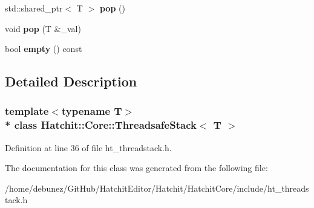 \begin{DoxyCompactItemize}
\item 
std\+::shared\+\_\+ptr$<$ T $>$ {\bfseries pop} ()\hypertarget{classHatchit_1_1Core_1_1ThreadsafeStack_aafae0641050816de8ca7c5090ab0a627}{}\label{classHatchit_1_1Core_1_1ThreadsafeStack_aafae0641050816de8ca7c5090ab0a627}

\item 
void {\bfseries pop} (T \&\+\_\+val)\hypertarget{classHatchit_1_1Core_1_1ThreadsafeStack_a4f6199d86eb2f311c9c58b3e23ad840e}{}\label{classHatchit_1_1Core_1_1ThreadsafeStack_a4f6199d86eb2f311c9c58b3e23ad840e}

\item 
bool {\bfseries empty} () const \hypertarget{classHatchit_1_1Core_1_1ThreadsafeStack_a9ac7b4af62073685e7150081003fd01c}{}\label{classHatchit_1_1Core_1_1ThreadsafeStack_a9ac7b4af62073685e7150081003fd01c}

\end{DoxyCompactItemize}


\subsection{Detailed Description}
\subsubsection*{template$<$typename T$>$\\*
class Hatchit\+::\+Core\+::\+Threadsafe\+Stack$<$ T $>$}



Definition at line 36 of file ht\+\_\+threadstack.\+h.



The documentation for this class was generated from the following file\+:\begin{DoxyCompactItemize}
\item 
/home/debunez/\+Git\+Hub/\+Hatchit\+Editor/\+Hatchit/\+Hatchit\+Core/include/ht\+\_\+threadstack.\+h\end{DoxyCompactItemize}
